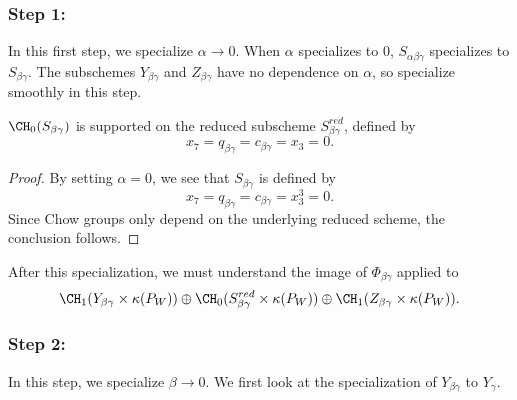 \subsubsection*{Step 1:}
In this first step, we specialize $\alpha \to 0$. When $\alpha$ specializes to 0, $S_{\alpha \beta \gamma}$ specializes to $S_{\beta \gamma}$. The subschemes $Y_{\beta \gamma}$ and $Z_{\beta \gamma}$ have no dependence on $\alpha$, so specialize smoothly in this step.
\begin{lemma}
  \label{lem:S1Specialization1}
  $\CH_0(S_{\beta \gamma})$ is supported on the reduced subscheme $S_{\beta \gamma}^{red}$, defined by
  \begin{equation}
  \label{eq:S1Equations}
  x_7 = q_{\beta \gamma} = c_{\beta \gamma} = x_3 = 0.
  \end{equation}
\end{lemma}
\begin{proof}
  By setting $\alpha =0$, we see that $S_{\beta \gamma}$ is defined by
\[x_7 = q_{\beta \gamma} = c_{\beta \gamma} = x_3^3 = 0.\]
Since Chow groups only depend on the underlying reduced scheme, the conclusion follows.
\end{proof}
After this specialization, we must understand the image of $\Phi_{\beta \gamma}$ applied to
\[\CH_1(Y_{\beta \gamma} \times \kappa(P_W)) \oplus \CH_0(S_{\beta \gamma}^{red}\times \kappa(P_W)) \oplus \CH_1(Z_{\beta \gamma}\times \kappa(P_W)).\]

\subsubsection*{Step 2:}
In this step, we specialize $\beta \to 0$. We first look at the specialization of $Y_{\beta \gamma}$ to $Y_\gamma$.

